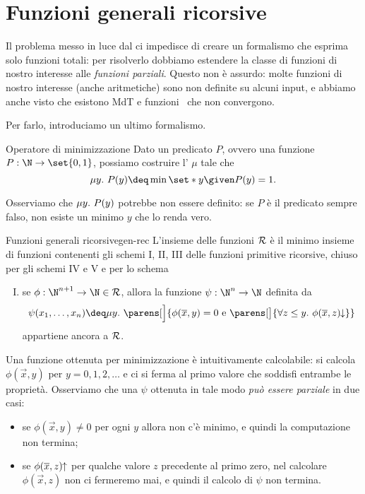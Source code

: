 \section{Funzioni generali ricorsive}

Il problema messo in luce dal  ci impedisce di creare un formalismo che esprima solo funzioni totali: per risolverlo dobbiamo estendere la classe di funzioni di nostro interesse alle \emph{funzioni parziali}. 
Questo non è assurdo: molte funzioni di nostro interesse (anche aritmetiche) sono non definite su alcuni input, e abbiamo anche visto che esistono MdT e funzioni \WHILE\ che non convergono.

Per farlo, introduciamo un ultimo formalismo.

\begin{definition}
    {Operatore di minimizzazione}{}
    Dato un predicato $P$, ovvero una funzione $P : \N \to \set{0, 1}$, possiamo costruire l' $\mu$ tale che \[
        \mi{y}{P(y)} \deq \min \set*{y \given P(y) = 1}.
    \]
\end{definition}

Osserviamo che $\mu{y}.\ {P(y)}$ potrebbe non essere definito: se $P$ è il predicato sempre falso, non esiste un minimo $y$ che lo renda vero.

\begin{definition}
    {Funzioni generali ricorsive}{gen-rec}
    L'insieme delle funzioni  $\mathcal{R}$ è il minimo insieme di funzioni contenenti gli schemi I, II, III delle funzioni primitive ricorsive, chiuso per gli schemi IV e V e per lo schema \begin{enumerate}[I., start=6]
        \item {} se $\phi : \N^{n+1} \to \N \in \Rec$, allora la funzione $\psi : \N^n \to \N$ definita da \[
            \psi(x_1, \dots, x_n) \deq \mi{y}{\parens[\Big]{\phi(\vec x, y) = 0 \text{ e } \parens[\big]{\forall z \leq y.\ \phi(\vec x, z)\conv}}}
        \] appartiene ancora a $\mathcal{R}$. 
    \end{enumerate} 
\end{definition}

Una funzione ottenuta per minimizzazione è intuitivamente calcolabile: si calcola $\phi(\vec x, y)$ per $y = 0, 1, 2, \dots$ e ci si ferma al primo valore che soddisfi entrambe le proprietà. Osserviamo che una $\psi$ ottenuta in tale modo \emph{può essere parziale} in due casi: \begin{itemize}
    \item se $\phi(\vec x, y) \neq 0$ per ogni $y$ allora non c'è minimo, e quindi la computazione non termina;
    \item se $\phi(\overline{x}, z)\!\!\uparrow$ per qualche valore $z$ precedente al primo zero, nel calcolare $\phi(\vec x, z)$ non ci fermeremo mai, e quindi il calcolo di $\psi$ non termina.  
\end{itemize}

